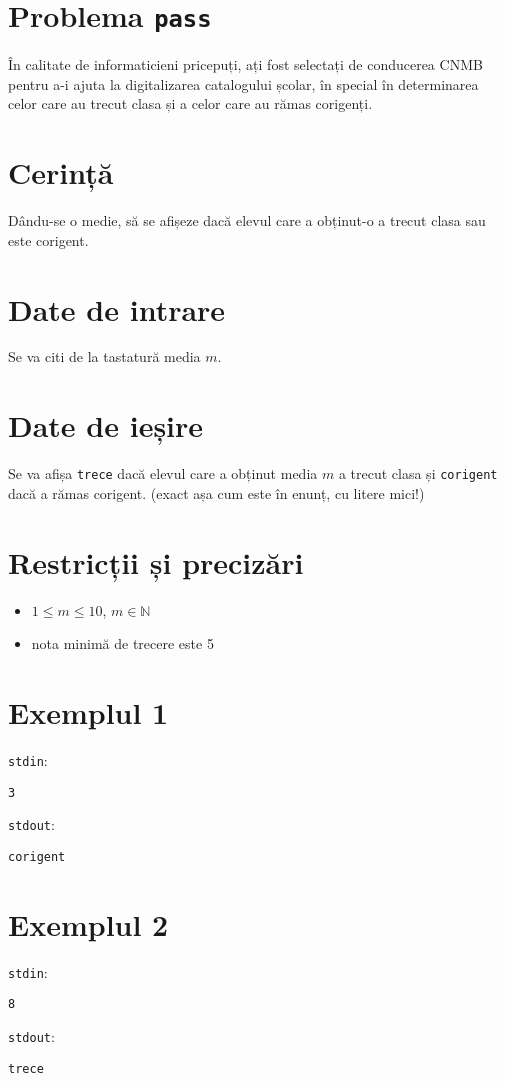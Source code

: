 \documentclass{scrartcl}
\author{Test Tutors of CNMB Informatică}
\date{17 februarie 2024}
\begin{document}
\section*{Problema \texttt{pass}}
În calitate de informaticieni pricepuți, ați fost selectați de conducerea CNMB pentru a-i ajuta la digitalizarea catalogului școlar,
în special în determinarea celor care au trecut clasa și a celor care au rămas corigenți.
\section*{Cerință}
Dându-se o medie, să se afișeze dacă elevul care a obținut-o a trecut clasa sau este corigent.
\section*{Date de intrare}
Se va citi de la tastatură media $m$.
\section*{Date de ieșire}
Se va afișa \texttt{trece} dacă elevul care a obținut media $m$ a trecut clasa și \texttt{corigent} dacă a rămas corigent.
(exact așa cum este în enunț, cu litere mici!)
\section*{Restricții și precizări}
\begin{itemize}
    \item $1 \leq m \leq 10$, $m \in \mathbb{N}$
    \item nota minimă de trecere este 5
\end{itemize}

{
\parindent0pt
    
\section*{Exemplul 1}
\texttt{stdin}:
    \begin{lstlisting}
3
    \end{lstlisting}

\texttt{stdout}:
    \begin{lstlisting}
corigent
    \end{lstlisting}

\section*{Exemplul 2}
\texttt{stdin}:
    \begin{lstlisting}
8
    \end{lstlisting}

\texttt{stdout}:
    \begin{lstlisting}
trece
    \end{lstlisting}
}
\end{document}
